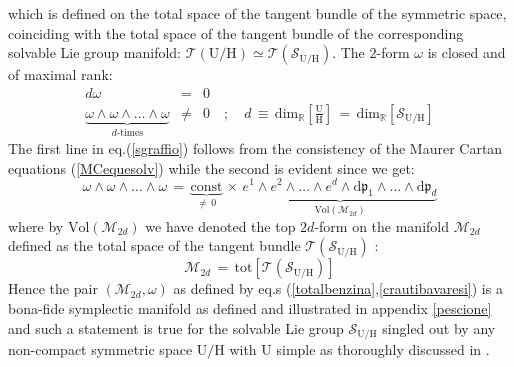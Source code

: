 \documentclass[10pt,a4paper]{article}
\begin{document}
which is defined on the total space of the tangent bundle of the symmetric space, coinciding with the total space of the tangent bundle of the corresponding solvable Lie group manifold:
$\mathcal{T}(\mathrm{U/H})\simeq \mathcal{T}(\mathcal{S}_\mathrm{U/H})$. The $2$-form $\omega$ is closed and of maximal rank:
\begin{eqnarray}
\label{sgraffio}
  d\omega &=& 0 \nonumber\\
  \underbrace{\omega\wedge\omega\wedge\dots\wedge\omega}_{\text{$d$-times}} &\neq& 0 \quad ; \quad d\, \equiv \, \mathrm{dim}_\mathbb{R} \left[\frac{\mathrm{U}}{\mathrm{H}} \right] \, = \, \mathrm{dim}_\mathbb{R} \left[\mathcal{S}_{\mathrm{U/H}} \right]
\end{eqnarray}
The first line in eq.(\ref{sgraffio}) follows from the consistency of the Maurer Cartan equations (\ref{MCequesolv}) while the second is evident since we get:
\begin{equation}\label{volumetto}
  \omega\wedge\omega\wedge\dots\wedge\omega \, = \, \underbrace{\text{const}}_{\neq \, 0} \,\times \,  \underbrace{e^1\wedge e^2 \wedge \dots \wedge e^d \wedge \mathrm{d}\mathfrak{p}_1 \wedge \dots \wedge \mathrm{d}\mathfrak{p}_d}_{\mathrm{Vol}(\mathcal{M}_{2d})}
\end{equation}
where by $\mathrm{Vol}(\mathcal{M}_{2d})$ we have denoted the top $2d$-form on the manifold $\mathcal{M}_{2d}$ defined as the total space of the tangent bundle $\mathcal{T}(\mathcal{S}_\mathrm{U/H})$ :
\begin{equation}\label{totalbenzina}
  \mathcal{M}_{2d} \, = \, \mathrm{tot}\left[\mathcal{T}(\mathcal{S}_\mathrm{U/H})\right]
\end{equation}
Hence the pair $(\mathcal{M}_{2d},\omega)$ as defined by eq.s (\ref{totalbenzina},\ref{crautibavaresi}) is a bona-fide symplectic manifold as defined and illustrated in appendix \ref{pescione} and such a statement is true for the solvable Lie group $\mathcal{S}_{\mathrm{U/H}}$ singled out by any non-compact symmetric space $\mathrm{U/H}$ with $\mathrm{U}$ simple as thoroughly discussed in \cite{pgtstheory,TSnaviga}.
\end{document}
